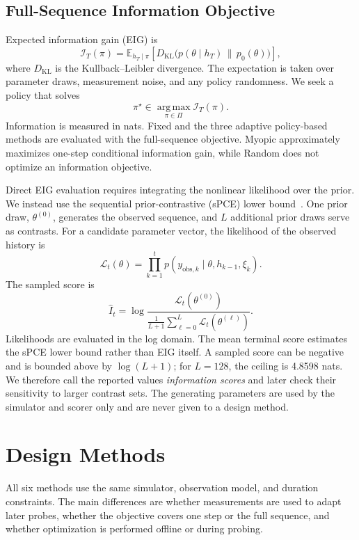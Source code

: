 \documentclass[conference,letterpaper]{IEEEtran}
\newcommand{\E}{\mathbb E}
\begin{document}
\subsection{Full-Sequence Information Objective}
Expected information gain (EIG) is
\begin{equation}
\mathcal I_T(\pi)=\E_{h_T\mid\pi}
\!\left[D_{\mathrm{KL}}\bigl(p(\theta\mid h_T)\,\|\,p_0(\theta)\bigr)\right],
\label{eq:eig}
\end{equation}
where $D_{\mathrm{KL}}$ is the Kullback--Leibler divergence. The expectation is taken over parameter draws, measurement noise, and any policy randomness. We seek a policy that solves
\begin{equation}
\pi^\star\in\operatorname*{arg\,max}_{\pi\in\Pi}\mathcal I_T(\pi).
\label{eq:design_problem}
\end{equation}
Information is measured in nats. Fixed and the three adaptive policy-based methods are evaluated with the full-sequence objective. Myopic approximately maximizes one-step conditional information gain, while Random does not optimize an information objective.

Direct EIG evaluation requires integrating the nonlinear likelihood over the prior. We instead use the sequential prior-contrastive (sPCE) lower bound~\cite{foster2021dad}. One prior draw, $\theta^{(0)}$, generates the observed sequence, and $L$ additional prior draws serve as contrasts. For a candidate parameter vector, the likelihood of the observed history is
\begin{equation}
\mathcal L_t(\theta)=\prod_{k=1}^{t}
p(y_{\mathrm{obs},k}\mid\theta,h_{k-1},\xi_k).
\label{eq:likelihood}
\end{equation}
The sampled score is
\begin{equation}
\widehat I_t=\log\frac{\mathcal L_t(\theta^{(0)})}
{\frac{1}{L+1}\sum_{\ell=0}^{L}\mathcal L_t(\theta^{(\ell)})}.
\label{eq:spce}
\end{equation}
Likelihoods are evaluated in the log domain. The mean terminal score estimates the sPCE lower bound rather than EIG itself. A sampled score can be negative and is bounded above by $\log(L+1)$; for $L=128$, the ceiling is 4.8598 nats. We therefore call the reported values \emph{information scores} and later check their sensitivity to larger contrast sets. The generating parameters are used by the simulator and scorer only and are never given to a design method.

\section{Design Methods}\label{sec:methods}
All six methods use the same simulator, observation model, and duration constraints. The main differences are whether measurements are used to adapt later probes, whether the objective covers one step or the full sequence, and whether optimization is performed offline or during probing.
\end{document}
